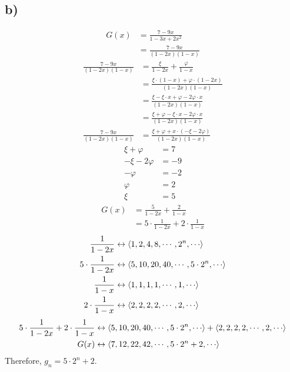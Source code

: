 \documentclass[12pt]{article}
\begin{document}
\subsection*{b) }
\begin{align*}
G(x) &= \frac{7-9x}{1-3x+2x^2} \\
&= \frac{7-9x}{(1-2x)(1-x)}
\end{align*}
\begin{align*}
\frac{7-9x}{(1-2x)(1-x)} &= \frac{\xi}{1-2x} + \frac{\varphi}{1-x} \\
&= \frac{\xi \cdot (1-x) + \varphi \cdot (1-2x)}{(1-2x)(1-x)} \\
&= \frac{\xi - \xi \cdot x + \varphi - 2 \varphi \cdot x}{(1-2x)(1-x)} \\
&= \frac{\xi + \varphi - \xi \cdot x - 2 \varphi \cdot x}{(1-2x)(1-x)} \\
\frac{7-9x}{(1-2x)(1-x)} &= \frac{\xi + \varphi + x \cdot (- \xi - 2 \varphi)}{(1-2x)(1-x)}
\end{align*}
\begin{align*}
\xi + \varphi &= 7 \\
-\xi - 2\varphi &= -9 \\
-\varphi &= -2 \\
\varphi &= 2 \\
\xi &= 5
\end{align*}
\begin{align*}
G(x) &= \frac{5}{1-2x} + \frac{2}{1-x} \\
&= 5 \cdot \frac{1}{1-2x} + 2 \cdot \frac{1}{1-x}
\end{align*}
\begin{align*}
\frac{1}{1-2x} &\leftrightarrow \Braket{1, 2, 4, 8, \cdots, 2^n, \cdots} \\
5 \cdot \frac{1}{1-2x} &\leftrightarrow \Braket{5, 10, 20, 40, \cdots, 5 \cdot 2^n, \cdots} \\
\frac{1}{1-x} &\leftrightarrow \Braket{1, 1, 1, 1, \cdots, 1, \cdots} \\
2 \cdot \frac{1}{1-x} &\leftrightarrow \Braket{2, 2, 2, 2, \cdots, 2, \cdots}
\end{align*}
\begin{align*}
5 \cdot \frac{1}{1-2x} + 2 \cdot \frac{1}{1-x} &\leftrightarrow \Braket{5, 10, 20, 40, \cdots, 5 \cdot 2^n, \cdots} + \Braket{2, 2, 2, 2, \cdots, 2, \cdots} \\
G(x) &\leftrightarrow \Braket{7, 12, 22, 42, \cdots, 5 \cdot 2^n + 2, \cdots} \\
\end{align*}
Therefore, $g_n = 5 \cdot 2^n + 2$.
\end{document}
